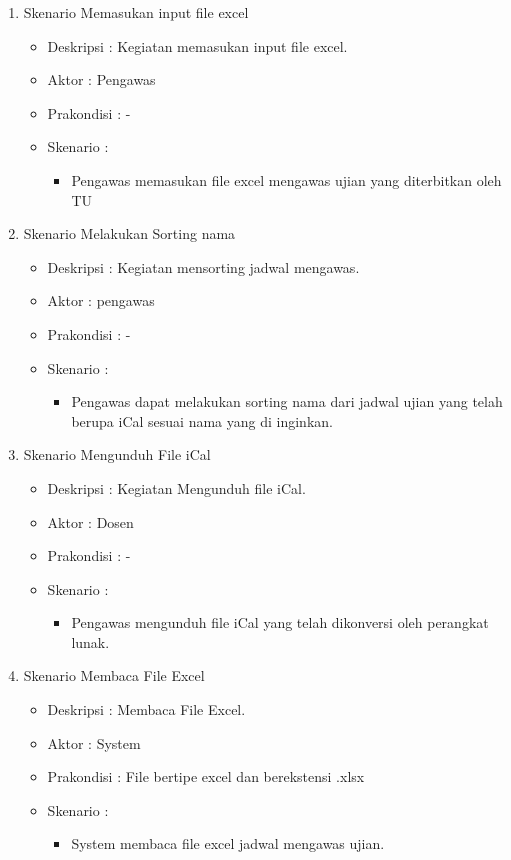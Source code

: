\begin{enumerate}
	\item Skenario Memasukan input file excel \\
	{\renewcommand\labelitemi{}
		\begin{itemize}
			\item Deskripsi		: Kegiatan memasukan input file excel.
			\item Aktor				: Pengawas
			\item Prakondisi	: -
			\item Skenario		:
				\begin{itemize}
					\item Pengawas memasukan file excel mengawas ujian yang diterbitkan oleh TU
				\end{itemize}
		\end{itemize}
		}
		
	\item Skenario Melakukan Sorting nama
	{\renewcommand\labelitemi{}
	\begin{itemize}
			\item Deskripsi		: Kegiatan mensorting jadwal mengawas.
			\item Aktor				: pengawas
			\item Prakondisi	: -
			\item Skenario		:
				\begin{itemize}
					\item Pengawas
					dapat melakukan sorting nama dari jadwal ujian yang telah berupa iCal sesuai nama yang di inginkan. 
				\end{itemize}
		\end{itemize}
		}
		
		\item Skenario Mengunduh File iCal 
		{\renewcommand\labelitemi{}
		\begin{itemize}
			\item Deskripsi		: Kegiatan Mengunduh file iCal.
			\item Aktor				: Dosen 
			\item Prakondisi	: -
			\item Skenario		:
				\begin{itemize}
					\item Pengawas mengunduh file iCal yang telah dikonversi oleh perangkat lunak.
				\end{itemize}
		\end{itemize}
		}
		
		\item Skenario Membaca File Excel
		{\renewcommand\labelitemi{}
		\begin{itemize}
			\item Deskripsi		: Membaca File Excel.
			\item Aktor				: System 
			\item Prakondisi	: File bertipe excel dan berekstensi .xlsx
			\item Skenario		:
				\begin{itemize}
					\item System membaca file excel jadwal mengawas ujian.
				\end{itemize}
		\end{itemize}
		}
		

\end{enumerate}
